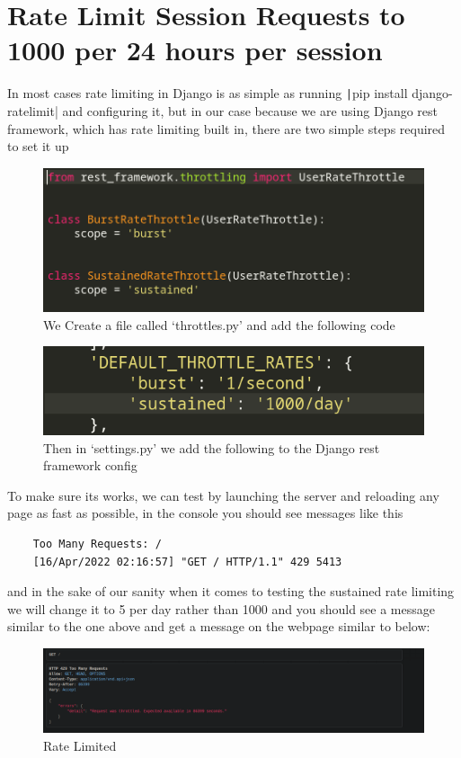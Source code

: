 \documentclass{article}
\begin{document}
	\section{Rate Limit Session Requests to 1000 per 24 hours per session}

    In most cases rate limiting in Django is as simple as running \texttt|pip install django-ratelimit| and configuring it, but in our case because we are using Django rest framework, which has rate limiting built in, there are two simple steps required to set it up
    
    \begin{figure}[!htb]
        \caption{We Create a file called `throttles.py' and add the following code}
        \includegraphics[scale=0.70]{rate1}
    \end{figure}
    
    \begin{figure}[!tb]
        \caption{Then in `settings.py' we add the following to the Django rest framework config}
        \includegraphics{rate2}
    \end{figure}
    \newpage
    
    To make sure its works, we can test by launching the server and reloading any page as fast as possible, in the console you should see messages like this 
    \begin{verbatim}
    Too Many Requests: /
    [16/Apr/2022 02:16:57] "GET / HTTP/1.1" 429 5413
    \end{verbatim}
    
    and in the sake of our sanity when it comes to testing the sustained rate limiting we will change it to 5 per day rather than 1000 and you should see a message similar to the one above and get a message on the webpage similar to below:
    \\
    \begin{figure}[!htb]
        \caption{Rate Limited}
        \includegraphics[scale=0.50]{rate3}
    \end{figure}
    \newpage
\end{document}
